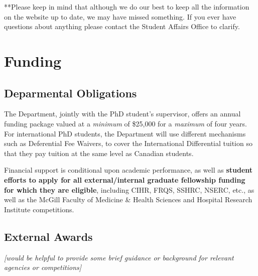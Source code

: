 \documentclass[
  openany]{book}
\begin{document}
**Please keep in mind that although we do our best to keep all the information on the website up to date, we may have missed something. If you ever have questions about anything please contact the Student Affairs Office to clarify.

\hypertarget{funding}{%
\chapter{Funding}\label{funding}}

\hypertarget{deparmental-obligations}{%
\section{Deparmental Obligations}\label{deparmental-obligations}}

The Department, jointly with the PhD student's supervisor, offers an annual funding package valued at a \emph{minimum} of \$25,000 for a \emph{maximum} of four years. For international PhD students, the Department will use different mechanisms such as Deferential Fee Waivers, to cover the International Differential tuition so that they pay tuition at the same level as Canadian students.

Financial support is conditional upon academic performance, as well as \textbf{student efforts to apply for all external/internal graduate fellowship funding for which they are eligible}, including CIHR, FRQS, SSHRC, NSERC, etc., as well as the McGill Faculty of Medicine \& Health Sciences and Hospital Research Institute competitions.

\hypertarget{external-awards}{%
\section{External Awards}\label{external-awards}}

\emph{{[}would be helpful to provide some brief guidance or background for relevant agencies or competitions{]}}

  
\end{document}
